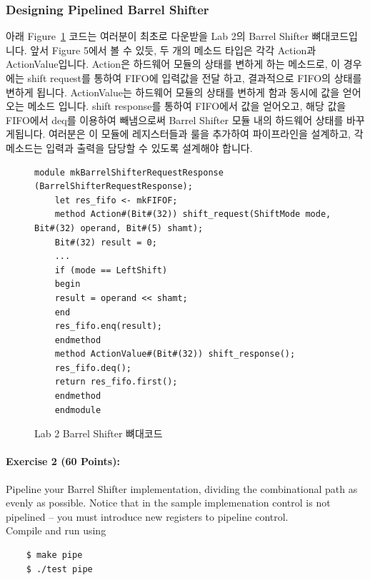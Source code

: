 \documentclass{article}
\begin{document}
\subsubsection{Designing Pipelined Barrel Shifter}
아래 Figure~\ref{fig:brs_skeleton} 코드는 여러분이 최초로 다운받을 Lab 2의 Barrel Shifter 뼈대코드입니다. 앞서 Figure
5에서 볼 수 있듯, 두 개의 메소드 타입은 각각 Action과 ActionValue입니다. Action은 하드웨어
모듈의 상태를 변하게 하는 메소드로, 이 경우에는 shift request를 통하여 FIFO에 입력값을 전달
하고, 결과적으로 FIFO의 상태를 변하게 됩니다. ActionValue는 하드웨어 모듈의 상태를 변하게
함과 동시에 값을 얻어오는 메소드 입니다. shift response를 통하여 FIFO에서 값을 얻어오고,
해당 값을 FIFO에서 deq를 이용하여 빼냄으로써 Barrel Shifter 모듈 내의 하드웨어 상태를 바꾸
게됩니다. 여러분은 이 모듈에 레지스터들과 룰을 추가하여 파이프라인을 설계하고, 각 메소드는
입력과 출력을 담당할 수 있도록 설계해야 합니다.


\begin{figure}[!ht]
	\centering
\begin{Verbatim}[frame=single]
	module mkBarrelShifterRequestResponse (BarrelShifterRequestResponse);
	let res_fifo <- mkFIFOF;
	method Action#(Bit#(32)) shift_request(ShiftMode mode, Bit#(32) operand, Bit#(5) shamt);
	Bit#(32) result = 0;
	...
	if (mode == LeftShift)
	begin
	result = operand << shamt;
	end
	res_fifo.enq(result);
	endmethod
	method ActionValue#(Bit#(32)) shift_response();
	res_fifo.deq();
	return res_fifo.first();
	endmethod
	endmodule
\end{Verbatim}
	\caption{Lab 2 Barrel Shifter 뼈대코드}
	\label{fig:brs_skeleton}
\end{figure}



\noindent \paragraph{\bf Exercise 2 (60 Points):} Pipeline your Barrel Shifter implementation, 
dividing the combinational path as evenly as possible. Notice that in the sample implemenation control
is not pipelined – you must introduce new registers to pipeline control.
\\\indent Compile and run using

\begin{Verbatim}
    $ make pipe
    $ ./test pipe
\end{Verbatim}
\end{document}
